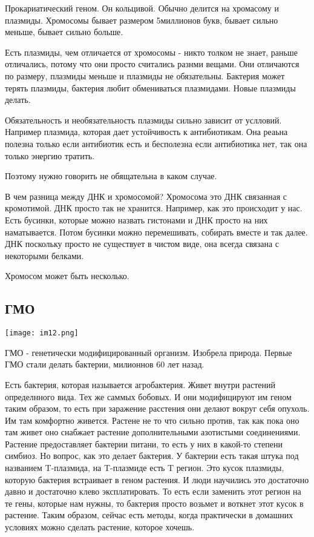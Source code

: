 Прокариатический геном. Он кольцивой. Обычно 
делится на хромасому и плазмиды. Хромосомы бывает размером 
5миллионов букв, бывает сильно меньше, 
бывает сильно больше. 

Есть плазмиды, чем отличается от хромосомы - никто толком не знает, 
раньше отличались, потому что они просто считались разнми вещами.
Они отличаются по размеру, плазмиды меньше и плазмиды не 
обязательны. Бактерия может терять плазмиды, бактерия любит 
обмениваться плазмидами. Новые плазмиды делать. 

Обязательность и необязательность плазмиды сильно зависит от услловий.
Например плазмида, которая дает
устойчивость к антибиотикам. Она реаьна полезна только
если антибиотик есть и бесполезна если антибиотика нет,
так она только энергию тратить.

Поэтому нужно говорить не обящательна в каком случае.

В чем разница между ДНК и хромосомой?
Хромосома это ДНК связанная с кромотимой. ДНК
просто так не хранится. Например,
как это происходит у нас. Есть бусинки,
которые можно назвать гистонами и ДНК просто на них
наматывается. Потом бусинки можно перемешивать,
собирать вместе и так далее. ДНК поскольку
просто не существует в чистом виде, она
всегда связана с некоторыми белками.

Хромосом может быть несколько.   

\subsection{ГМО}
\texttt{[image: im12.png]}

ГМО - генетически модифицированный организм. Изобрела природа. 
Первые ГМО стали делать бактерии, милионнов 60 лет назад. 

Есть бактерия, которая называется агробактерия. Живет внутри 
растений определнного вида. Тех же 
саммых бобовых. И они модифицируют им геном таким образом, 
то есть при заражение расстения они делают вокруг 
себя опухоль. Им там комфортно живется. Растене
не то что сильно против, так как пока оно
там живет оно снабжает
растение дополнительными азотистыми соединениями. Растение
предоставляет бактерии питани, то есть
у них в какой-то степени симбиоз. Но вопрос, как это
делает бактерия. У бактерии есть
такая штука под названием T-плазмида, на T-плазмиде есть
T регион. Это кусок плазмиды, которую бактерия
встраивает в геном растения. И люди научились это
достаточно давно и достаточно клево эксплатировать. То есть
если заменить этот регион на те гены, которые нам нужны, то бактерия просто возьмет
и воткнет этот кусок в растение. Таким образом,
сейчас есть методы, когда практически в домашних условиях
можно сделать растение, которое хочешь.

